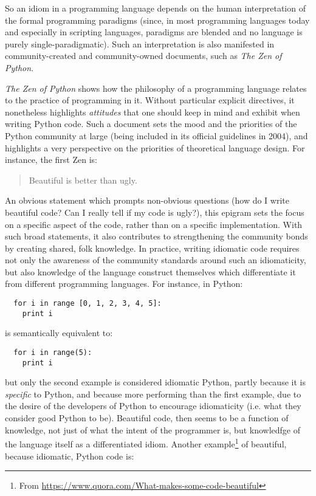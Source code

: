 So an idiom in a programming language depends on the human interpretation of the formal programming paradigms (since, in most programming languages today and especially in scripting languages, paradigms are blended and no language is purely single-paradigmatic). Such an interpretation is also manifested in community-created and community-owned documents, such as \emph{The Zen of Python}\citep{peters_code_1999}.

\emph{The Zen of Python} shows how the philosophy of a programming language relates to the practice of programming in it. Without particular explicit directives, it nonetheless highlights \emph{attitudes} that one should keep in mind and exhibit when writing Python code. Such a document sets the mood and the priorities of the Python community at large (being included in its official guidelines in 2004), and highlights a very perspective on the priorities of theoretical language design. For instance, the first Zen is:

\begin{quote}
  Beautiful is better than ugly.
\end{quote}

An obvious statement which prompts non-obvious questions (how do I write beautiful code? Can I really tell if my code is ugly?), this epigram sets the focus on a specific aspect of the code, rather than on a specific implementation. With such broad statements, it also contributes to strengthening the community bonds by creating shared, folk knowledge. In practice, writing idiomatic code requires not only the awareness of the community standards around such an idiomaticity, but also knowledge of the language construct themselves which differentiate it from different programming languages. For instance, in Python:

\begin{lstlisting}
  for i in range [0, 1, 2, 3, 4, 5]:
    print i
\end{lstlisting}

is semantically equivalent to:

\begin{lstlisting}
  for i in range(5):
    print i
\end{lstlisting}

but only the second example is considered idiomatic Python, partly because it is \emph{specific} to Python, and because more performing than the first example, due to the desire of the developers of Python to encourage idiomaticity (i.e. what they consider good Python to be). Beautiful code, then seems to be a function of knowledge, not just of what the intent of the programmer is, but knowledfge of the language itself as a differentiated idiom. Another example\footnote{From \url{https://www.quora.com/What-makes-some-code-beautiful}} of beautiful, because idiomatic, Python code is:

